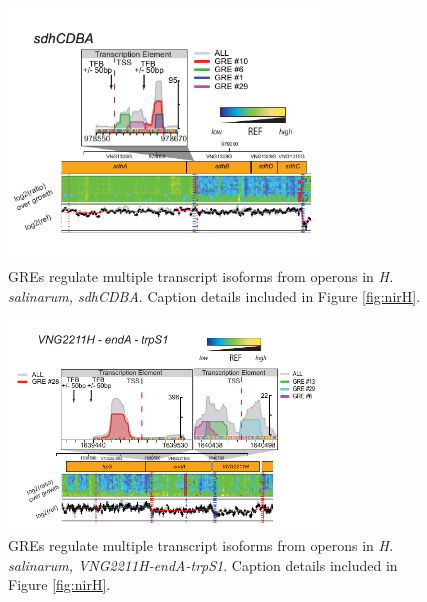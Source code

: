 \begin{figure}[h!]
    \centering
    \includegraphics[width=0.75\textwidth]{figures/sdh}
 	\caption[Transcriptional evidence for multiple transcript isoforms from the same operon: \textit{sdhCDBA}, \halo ]{GREs regulate multiple transcript isoforms from operons in \textit{H. salinarum, sdhCDBA}. Caption details included in Figure \ref{fig:nirH}.}
    \label{fig:sdh}
\end{figure}

\begin{figure}[h!]
    \centering
    \includegraphics[width=0.75\textwidth]{figures/vng2211h}
 	\caption[Transcriptional evidence for multiple transcript isoforms from the same operon: \textit{VNG2211H-endA-trpS1}, \halo ]{GREs regulate multiple transcript isoforms from operons in \textit{H. salinarum, VNG2211H-endA-trpS1}. Caption details included in Figure \ref{fig:nirH}.}
    \label{fig:vng2211h}
\end{figure}

